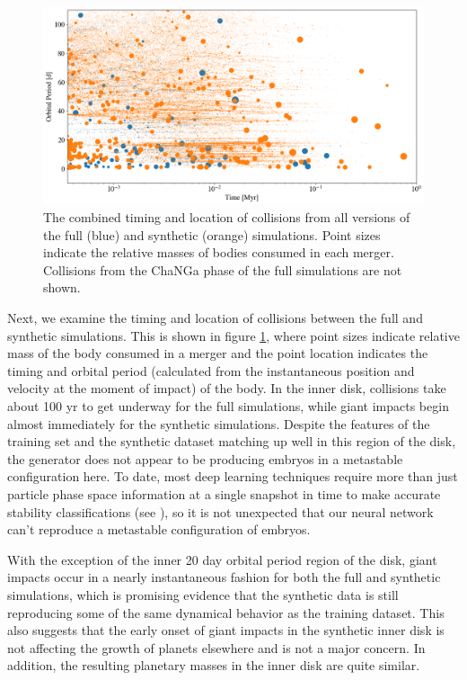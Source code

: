\begin{figure}
\begin{center}
    \includegraphics[width=\textwidth]{figures/stip/full_coll_syn_comp.png}
    \caption{The combined timing and location of collisions from all versions of the full (blue) and synthetic (orange) simulations. Point sizes indicate the relative masses of bodies consumed in each merger. Collisions from the {\sc ChaNGa} phase of the full simulations are not shown.\label{fig:full_coll_syn_comp}}
\end{center}
\end{figure}

Next, we examine the timing and location of collisions between the full and synthetic simulations. This is shown in figure \ref{fig:full_coll_syn_comp}, where point sizes indicate relative mass of the body consumed in a merger and the point location indicates the timing and orbital period (calculated from the instantaneous position and velocity at the moment of impact) of the body. In the inner disk, collisions take about 100 yr to get underway for the full simulations, while giant impacts begin almost immediately for the synthetic simulations. Despite the features of the training set and the synthetic dataset matching up well in this region of the disk, the generator does not appear to be producing embryos in a metastable configuration here. To date, most deep learning techniques require more than just particle phase space information at a single snapshot in time to make accurate stability classifications (see \cite{tamayo20, cranmer21}), so it is not unexpected that our neural network can't reproduce a metastable configuration of embryos.

With the exception of the inner 20 day orbital period region of the disk, giant impacts occur in a nearly instantaneous fashion for both the full and synthetic simulations, which is promising evidence that the synthetic data is still reproducing some of the same dynamical behavior as the training dataset. This also suggests that the early onset of giant impacts in the synthetic inner disk is not affecting the growth of planets elsewhere and is not a major concern. In addition, the resulting planetary masses in the inner disk are quite similar.

